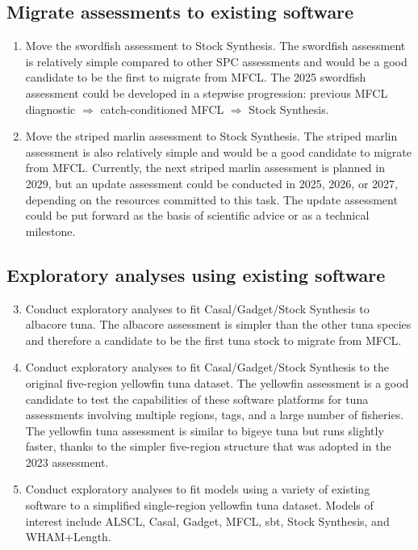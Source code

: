 \documentclass{SCreport}
\begin{document}
\subsection{Migrate assessments to existing software}

\begin{enumerate}
  \item Move the swordfish assessment to Stock Synthesis. The swordfish
  assessment is relatively simple compared to other SPC assessments and would be
  a good candidate to be the first to migrate from MFCL. The 2025 swordfish
  assessment could be developed in a stepwise progression: previous MFCL
  diagnostic $\Rightarrow$ catch-conditioned MFCL $\Rightarrow$ Stock Synthesis.
  \item Move the striped marlin assessment to Stock Synthesis. The striped
  marlin assessment is also relatively simple and would be a good candidate to
  migrate from MFCL. Currently, the next striped marlin assessment is planned in
  2029, but an update assessment could be conducted in 2025, 2026, or 2027,
  depending on the resources committed to this task. The update assessment could
  be put forward as the basis of scientific advice or as a technical milestone.
\end{enumerate}

\subsection{Exploratory analyses using existing software}

\begin{enumerate}\setcounter{enumi}{2}
  \item Conduct exploratory analyses to fit Casal/Gadget/Stock Synthesis to
  albacore tuna. The albacore assessment is simpler than the other tuna species
  and therefore a candidate to be the first tuna stock to migrate from MFCL.
  \item Conduct exploratory analyses to fit Casal/Gadget/Stock Synthesis to the
  original five-region yellowfin tuna dataset. The yellowfin assessment is a
  good candidate to test the capabilities of these software platforms for tuna
  assessments involving multiple regions, tags, and a large number of fisheries.
  The yellowfin tuna assessment is similar to bigeye tuna but runs slightly
  faster, thanks to the simpler \mbox{five-region} structure that was adopted in
  the 2023 assessment.
  \item Conduct exploratory analyses to fit models using a variety of existing
  software to a simplified single-region yellowfin tuna dataset. Models of
  interest include ALSCL, Casal, Gadget, MFCL, sbt, Stock Synthesis, and
  WHAM+Length.
\end{enumerate}
\end{document}
